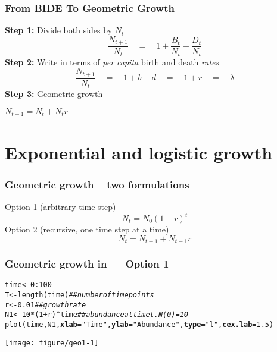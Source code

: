 \documentclass[color=usenames,dvipsnames]{beamer}\usepackage[]{graphicx}\usepackage[]{color}
\makeatletter
\newcommand{\hlnum}[1]{\textcolor[rgb]{0.69,0.494,0}{#1}}%
\newcommand{\hlstr}[1]{\textcolor[rgb]{0.749,0.012,0.012}{#1}}%
\newcommand{\hlcom}[1]{\textcolor[rgb]{0.514,0.506,0.514}{\textit{#1}}}%
\newcommand{\hlopt}[1]{\textcolor[rgb]{0,0,0}{#1}}%
\newcommand{\hlstd}[1]{\textcolor[rgb]{0,0,0}{#1}}%
\newcommand{\hlkwb}[1]{\textcolor[rgb]{0,0.341,0.682}{#1}}%
\newcommand{\hlkwc}[1]{\textcolor[rgb]{0,0,0}{\textbf{#1}}}%
\newcommand{\hlkwd}[1]{\textcolor[rgb]{0.004,0.004,0.506}{#1}}%
\newenvironment{kframe}{%
 \def\at@end@of@kframe{}%
 \ifinner\ifhmode%
  \def\at@end@of@kframe{\end{minipage}}%
  \begin{minipage}{\columnwidth}%
 \fi\fi%
 \def\FrameCommand##1{\hskip\@totalleftmargin \hskip-\fboxsep
 \colorbox{shadecolor}{##1}\hskip-\fboxsep
     \hskip-\linewidth \hskip-\@totalleftmargin \hskip\columnwidth}%
 \MakeFramed {\advance\hsize-\width
   \@totalleftmargin\z@ \linewidth\hsize
   \@setminipage}}%
 {\par\unskip\endMakeFramed%
 \at@end@of@kframe}
\newenvironment{knitrout}{}{} %
\makeatother
\begin{document}
\begin{frame}
  \frametitle{From {\color{red} BIDE} To Geometric Growth}
    \textbf{Step 1:} Divide both sides by $N_{t}$
      \[
        \frac{N_{t+1}}{N_{t}} \quad = \quad 1 + \frac{B_t}{N_{t}} - \frac{D_t}{N_{t}}
      \]
   \pause
    \textbf{Step 2:} Write in terms of \textit{per capita} birth and death \textit{rates}
      \[
        \frac{N_{t+1}}{N_{t}} \quad  = \quad 1 + b - d \quad = \quad 1 + r \quad = \quad \lambda
      \]
    \pause
    \textbf{Step 3:} Geometric growth \par
    \begin{center}
      $N_{t+1} = N_t + N_tr$
    \end{center}
\end{frame}






\section{Exponential and logistic growth}


\begin{frame}
  \frametitle{Geometric growth -- two formulations}
  Option 1 (arbitrary time step)
  \[
    N_t = N_0(1+r)^t
  \]
  \pause
  \vfill
  Option 2 (recursive, one time step at a time)
  \[
    N_t = N_{t-1} + N_{t-1}r
  \]
\end{frame}




\begin{frame}[fragile]
  \frametitle{Geometric growth in \R~-- Option 1}
\begin{knitrout}\scriptsize
{}\color{fgcolor}\begin{kframe}
\begin{alltt}
\hlstd{time} \hlkwb{<-} \hlnum{0}\hlopt{:}\hlnum{100}
\hlstd{T} \hlkwb{<-} \hlkwd{length}\hlstd{(time)}     \hlcom{## number of time points}
\hlstd{r} \hlkwb{<-} \hlnum{0.01}             \hlcom{## growth rate}
\hlstd{N1} \hlkwb{<-} \hlnum{10}\hlopt{*}\hlstd{(}\hlnum{1}\hlopt{+}\hlstd{r)}\hlopt{^}\hlstd{time}   \hlcom{## abundance at time t. N(0)=10}
\hlkwd{plot}\hlstd{(time, N1,} \hlkwc{xlab}\hlstd{=}\hlstr{"Time"}\hlstd{,} \hlkwc{ylab}\hlstd{=}\hlstr{"Abundance"}\hlstd{,} \hlkwc{type}\hlstd{=}\hlstr{"l"}\hlstd{,} \hlkwc{cex.lab}\hlstd{=}\hlnum{1.5}\hlstd{)}
\end{alltt}
\end{kframe}

{\centering \texttt{[image: figure/geo1-1]} 

}



\end{knitrout}
\end{frame}
\end{document}

